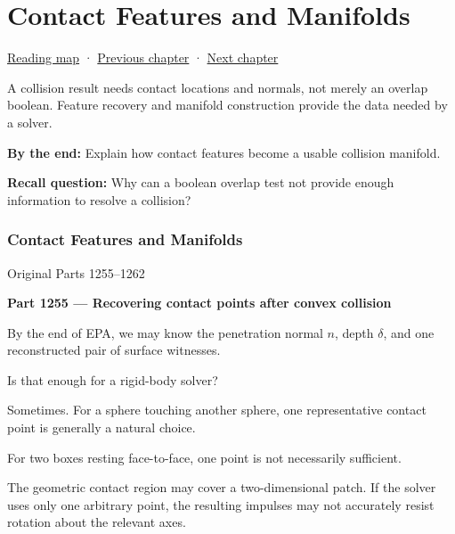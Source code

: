 \chapter{Contact Features and Manifolds}\label{04-visual-computing-ii-ch026-contact-features-and-manifolds}\hypertarget{04-visual-computing-ii-ch026}{}\label{stagechapter:04-visual-computing-ii-ch026}

\hypertarget{04-visual-computing-ii-ch026-contact-features-and-manifolds}{}

\hyperref[volume-reading-map]{Reading map} · \hyperref[04-visual-computing-ii-ch025-sat-for-triangle-and-convex-polygon-tests]{Previous chapter} · \hyperref[04-visual-computing-ii-ch027-mesh-queries-classification-and-clipping]{Next chapter}

A collision result needs contact locations and normals, not merely an overlap boolean. Feature recovery and manifold construction provide the data needed by a solver.

\textbf{By the end:} Explain how contact features become a usable collision manifold.

\textbf{Recall question:} Why can a boolean overlap test not provide enough information to resolve a collision?

\subsection{Contact Features and Manifolds}\label{04-visual-computing-ii-ch026-contact-features-and-manifolds-1}

\hypertarget{04-visual-computing-ii-ch026-contact-features-and-manifolds-1}{}

Original Parts 1255--1262

\textbf{Part 1255 --- Recovering contact points after convex collision}

By the end of EPA, we may know the penetration normal \(n\), depth \(\delta\), and one reconstructed pair of surface witnesses.

Is that enough for a rigid-body solver?

Sometimes. For a sphere touching another sphere, one representative contact point is generally a natural choice.

For two boxes resting face-to-face, one point is not necessarily sufficient.

The geometric contact region may cover a two-dimensional patch. If the solver uses only one arbitrary point, the resulting impulses may not accurately resist rotation about the relevant axes.

